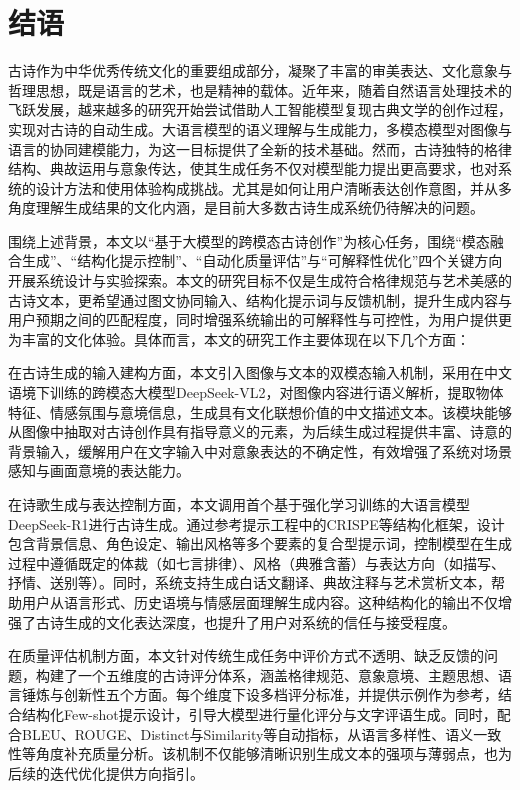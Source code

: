
\chapter{结语}
古诗作为中华优秀传统文化的重要组成部分，凝聚了丰富的审美表达、文化意象与哲理思想，既是语言的艺术，也是精神的载体。近年来，随着自然语言处理技术的飞跃发展，越来越多的研究开始尝试借助人工智能模型复现古典文学的创作过程，实现对古诗的自动生成。大语言模型的语义理解与生成能力，多模态模型对图像与语言的协同建模能力，为这一目标提供了全新的技术基础。然而，古诗独特的格律结构、典故运用与意象传达，使其生成任务不仅对模型能力提出更高要求，也对系统的设计方法和使用体验构成挑战。尤其是如何让用户清晰表达创作意图，并从多角度理解生成结果的文化内涵，是目前大多数古诗生成系统仍待解决的问题。

围绕上述背景，本文以“基于大模型的跨模态古诗创作”为核心任务，围绕“模态融合生成”、“结构化提示控制”、“自动化质量评估”与“可解释性优化”四个关键方向开展系统设计与实验探索。本文的研究目标不仅是生成符合格律规范与艺术美感的古诗文本，更希望通过图文协同输入、结构化提示词与反馈机制，提升生成内容与用户预期之间的匹配程度，同时增强系统输出的可解释性与可控性，为用户提供更为丰富的文化体验。具体而言，本文的研究工作主要体现在以下几个方面：

在古诗生成的输入建构方面，本文引入图像与文本的双模态输入机制，采用在中文语境下训练的跨模态大模型DeepSeek-VL2，对图像内容进行语义解析，提取物体特征、情感氛围与意境信息，生成具有文化联想价值的中文描述文本。该模块能够从图像中抽取对古诗创作具有指导意义的元素，为后续生成过程提供丰富、诗意的背景输入，缓解用户在文字输入中对意象表达的不确定性，有效增强了系统对场景感知与画面意境的表达能力。

在诗歌生成与表达控制方面，本文调用首个基于强化学习训练的大语言模型DeepSeek-R1进行古诗生成。通过参考提示工程中的CRISPE等结构化框架，设计包含背景信息、角色设定、输出风格等多个要素的复合型提示词，控制模型在生成过程中遵循既定的体裁（如七言排律）、风格（典雅含蓄）与表达方向（如描写、抒情、送别等）。同时，系统支持生成白话文翻译、典故注释与艺术赏析文本，帮助用户从语言形式、历史语境与情感层面理解生成内容。这种结构化的输出不仅增强了古诗生成的文化表达深度，也提升了用户对系统的信任与接受程度。

在质量评估机制方面，本文针对传统生成任务中评价方式不透明、缺乏反馈的问题，构建了一个五维度的古诗评分体系，涵盖格律规范、意象意境、主题思想、语言锤炼与创新性五个方面。每个维度下设多档评分标准，并提供示例作为参考，结合结构化Few-shot提示设计，引导大模型进行量化评分与文字评语生成。同时，配合BLEU、ROUGE、Distinct与Similarity等自动指标，从语言多样性、语义一致性等角度补充质量分析。该机制不仅能够清晰识别生成文本的强项与薄弱点，也为后续的迭代优化提供方向指引。

